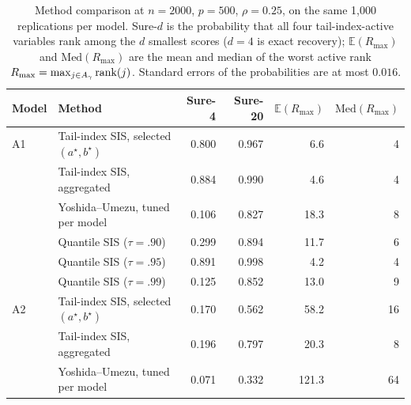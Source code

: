 \begin{table}[t]
\centering
\caption{Method comparison at $n=2000$, $p=500$, $\rho=0.25$, on the same 1{,}000 replications per model. Sure-$d$ is the probability that all four tail-index-active variables rank among the $d$ smallest scores ($d=4$ is exact recovery); $\mathbb{E}(R_{\max})$ and $\mathrm{Med}(R_{\max})$ are the mean and median of the worst active rank $R_{\max}=\max_{j\in A_\gamma}\mathrm{rank}(j)$. Standard errors of the probabilities are at most $0.016$.}
\label{tab:cmp500}
\begin{tabular}{llrrrr}
\toprule
Model & Method & Sure-4 & Sure-20 & $\mathbb{E}(R_{\max})$ & $\mathrm{Med}(R_{\max})$\\
\midrule
A1 & Tail-index SIS, selected $(a^\star,b^\star)$ & 0.800 & 0.967 & 6.6 & 4\\
 & Tail-index SIS, aggregated & 0.884 & 0.990 & 4.6 & 4\\
 & Yoshida--Umezu, tuned per model & 0.106 & 0.827 & 18.3 & 8\\
 & Quantile SIS ($\tau=.90$) & 0.299 & 0.894 & 11.7 & 6\\
 & Quantile SIS ($\tau=.95$) & 0.891 & 0.998 & 4.2 & 4\\
 & Quantile SIS ($\tau=.99$) & 0.125 & 0.852 & 13.0 & 9\\
\addlinespace
A2 & Tail-index SIS, selected $(a^\star,b^\star)$ & 0.170 & 0.562 & 58.2 & 16\\
 & Tail-index SIS, aggregated & 0.196 & 0.797 & 20.3 & 8\\
 & Yoshida--Umezu, tuned per model & 0.071 & 0.332 & 121.3 & 64\\


\end{tabular}
\end{table}
